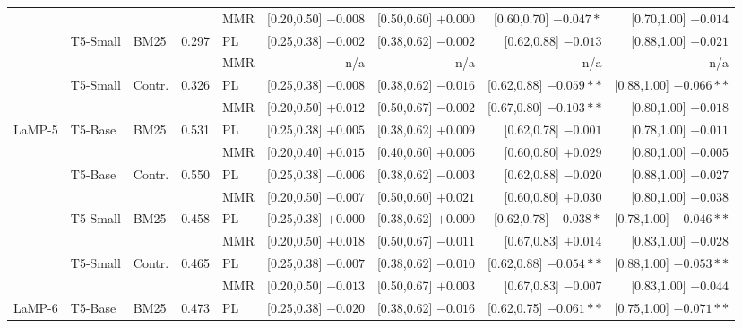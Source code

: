 \documentclass[10pt]{article}
\begin{document}
\begin{table}[p]
\begin{tabular}{@{}lllrlrrrr@{}}
 &  &  &  & MMR & [0.20,0.50] $-0.008$ & [0.50,0.60] $+0.000$ & [0.60,0.70] $-0.047*$ & [0.70,1.00] $+0.014$ \\
\cmidrule(lr){1-9}
 & \multirow{2}{*}{T5-Small} & \multirow{2}{*}{BM25} & \multirow{2}{*}{0.297} & PL & [0.25,0.38] $-0.002$ & [0.38,0.62] $-0.002$ & [0.62,0.88] $-0.013$ & [0.88,1.00] $-0.021$ \\
 &  &  &  & MMR & n/a & n/a & n/a & n/a \\
\cmidrule(lr){1-9}
 & \multirow{2}{*}{T5-Small} & \multirow{2}{*}{Contr.} & \multirow{2}{*}{0.326} & PL & [0.25,0.38] $-0.008$ & [0.38,0.62] $-0.016$ & [0.62,0.88] $-0.059**$ & [0.88,1.00] $-0.066**$ \\
 &  &  &  & MMR & [0.20,0.50] $+0.012$ & [0.50,0.67] $-0.002$ & [0.67,0.80] $-0.103**$ & [0.80,1.00] $-0.018$ \\
\midrule
\multirow{2}{*}{LaMP-5} & \multirow{2}{*}{T5-Base} & \multirow{2}{*}{BM25} & \multirow{2}{*}{0.531} & PL & [0.25,0.38] $+0.005$ & [0.38,0.62] $+0.009$ & [0.62,0.78] $-0.001$ & [0.78,1.00] $-0.011$ \\
 &  &  &  & MMR & [0.20,0.40] $+0.015$ & [0.40,0.60] $+0.006$ & [0.60,0.80] $+0.029$ & [0.80,1.00] $+0.005$ \\
\cmidrule(lr){1-9}
 & \multirow{2}{*}{T5-Base} & \multirow{2}{*}{Contr.} & \multirow{2}{*}{0.550} & PL & [0.25,0.38] $-0.006$ & [0.38,0.62] $-0.003$ & [0.62,0.88] $-0.020$ & [0.88,1.00] $-0.027$ \\
 &  &  &  & MMR & [0.20,0.50] $-0.007$ & [0.50,0.60] $+0.021$ & [0.60,0.80] $+0.030$ & [0.80,1.00] $-0.038$ \\
\cmidrule(lr){1-9}
 & \multirow{2}{*}{T5-Small} & \multirow{2}{*}{BM25} & \multirow{2}{*}{0.458} & PL & [0.25,0.38] $+0.000$ & [0.38,0.62] $+0.000$ & [0.62,0.78] $-0.038*$ & [0.78,1.00] $-0.046**$ \\
 &  &  &  & MMR & [0.20,0.50] $+0.018$ & [0.50,0.67] $-0.011$ & [0.67,0.83] $+0.014$ & [0.83,1.00] $+0.028$ \\
\cmidrule(lr){1-9}
 & \multirow{2}{*}{T5-Small} & \multirow{2}{*}{Contr.} & \multirow{2}{*}{0.465} & PL & [0.25,0.38] $-0.007$ & [0.38,0.62] $-0.010$ & [0.62,0.88] $-0.054**$ & [0.88,1.00] $-0.053**$ \\
 &  &  &  & MMR & [0.20,0.50] $-0.013$ & [0.50,0.67] $+0.003$ & [0.67,0.83] $-0.007$ & [0.83,1.00] $-0.044$ \\
\midrule
\multirow{2}{*}{LaMP-6} & \multirow{2}{*}{T5-Base} & \multirow{2}{*}{BM25} & \multirow{2}{*}{0.473} & PL & [0.25,0.38] $-0.020$ & [0.38,0.62] $-0.016$ & [0.62,0.75] $-0.061**$ & [0.75,1.00] $-0.071**$ \\

\end{tabular}
\end{table}
\end{document}
